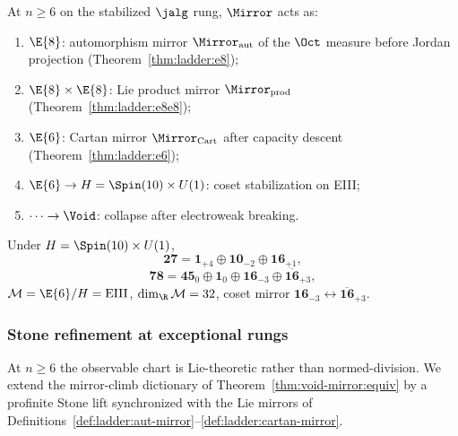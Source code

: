\begin{proposition}\label{prop:ladder:exceptional}
At $n\geq6$ on the stabilized $\jalg$ rung, $\Mirror$ acts as:
\begin{enumerate}[label=(\roman*),leftmargin=*]
  \item $\E{8}$: automorphism mirror $\Mirror_{\mathrm{aut}}$ of the $\Oct$
    measure before Jordan projection (Theorem~\ref{thm:ladder:e8});
  \item $\E{8}\times\E{8}$: Lie product mirror $\Mirror_{\mathrm{prod}}$
    (Theorem~\ref{thm:ladder:e8e8});
  \item $\E{6}$: Cartan mirror $\Mirror_{\mathrm{Cart}}$ after capacity descent
    (Theorem~\ref{thm:ladder:e6});
  \item $\E{6}\to H=\Spin(10)\times U(1)$: coset stabilization on EIII;
  \item $\cdots\to\Void$: collapse after electroweak breaking.
\end{enumerate}
\end{proposition}

\begin{proposition}[Branchings at $\E{6}$]\label{prop:ladder:e6branch}
Under $H=\Spin(10)\times U(1)$,
\begin{equation}\label{eq:foundations:27branch}
  \mathbf{27}=\mathbf{1}_{+4}\oplus\mathbf{10}_{-2}\oplus\mathbf{16}_{+1},
\end{equation}
\begin{equation}\label{eq:foundations:adjoint}
  \mathbf{78}=\mathbf{45}_0\oplus\mathbf{1}_0
  \oplus\mathbf{16}_{-3}\oplus\overline{\mathbf{16}}_{+3},
\end{equation}
$\mathcal{M}=\E{6}/H=\mathrm{EIII}$, $\dim_{\R}\mathcal{M}=32$, coset mirror
$\mathbf{16}_{-3}\leftrightarrow\overline{\mathbf{16}}_{+3}$.
\end{proposition}

\subsubsection{Stone refinement at exceptional rungs}
\label{sec:ladder:stone-exceptional}

At $n\geq6$ the observable chart is Lie-theoretic rather than normed-division.
We extend the mirror-climb dictionary of
Theorem~\ref{thm:void-mirror:equiv} by a profinite Stone lift synchronized with
the Lie mirrors of
Definitions~\ref{def:ladder:aut-mirror}--\ref{def:ladder:cartan-mirror}.

